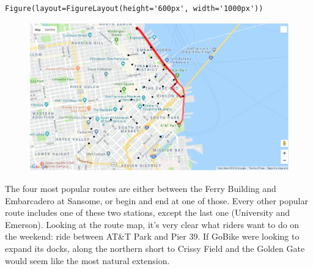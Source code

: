 \documentclass[11pt]{article}
\makeatletter
\def\maxwidth{\ifdim\Gin@nat@width>\linewidth\linewidth
    \else\Gin@nat@width\fi}
\let\Oldincludegraphics\includegraphics
\renewcommand{\includegraphics}[1]{\Oldincludegraphics[width=.8\maxwidth]{#1}}
\makeatother
\begin{document}
    
    \begin{verbatim}
Figure(layout=FigureLayout(height='600px', width='1000px'))
    \end{verbatim}

    
    \begin{figure}[htbp]
\centering
\includegraphics{imgs/tourist_routes.PNG?raw=true}
\caption{}
\end{figure}

    The four most popular routes are either between the Ferry Building and
Embarcadero at Sansome, or begin and end at one of those. Every other
popular route includes one of these two stations, except the last one
(University and Emerson). Looking at the route map, it's very clear what
riders want to do on the weekend: ride between AT\&T Park and Pier 39.
If GoBike were looking to expand its docks, along the northern short to
Crissy Field and the Golden Gate would seem like the most natural
extension.
\end{document}

